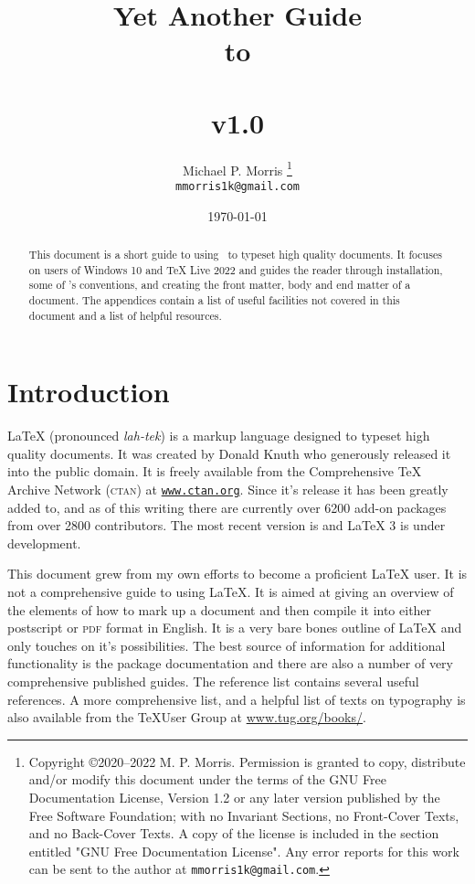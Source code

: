 \documentclass[12pt, a4paper]{article}
\title{
Yet Another Guide \\
to \\
\LaTeXe \\ 
{\Large v1.0} \\}
\author{Michael P. Morris \footnote {Copyright \copyright  2020--2022  M. P. Morris. Permission is granted to copy, distribute and/or modify this document under the terms of the GNU Free Documentation License, Version 1.2 or any later version published by the Free Software Foundation; with no Invariant Sections, no Front-Cover Texts, and no Back-Cover Texts. A copy of the license is included in the section entitled "GNU Free Documentation License". Any error reports for this work can be sent to the author at \texttt{mmorris1k@gmail.com}.} \\ 
\texttt{{\footnotesize mmorris1k@gmail.com}}}
\date{\today}
\begin{document}
\maketitle
\thispagestyle{empty}

\begin{abstract}
This document is a short guide to using \LaTeXe\ to typeset high quality documents. It focuses on users of Windows 10 and TeX Live 2022 and guides the reader through installation, some of \LaTeXe's conventions, and creating the front matter, body and end matter of a document. The appendices contain a list of useful facilities not covered in this document and a list of helpful resources.
\end{abstract}



{}
\tableofcontents

\clearpage
\listoffigures

\clearpage
\listoftables

\clearpage
{}

\section{Introduction}

LaTeX (pronounced \emph{lah-tek}) is a markup language designed to typeset high quality documents. It was created by Donald Knuth who generously released it into the public domain. It is freely available from the Comprehensive TeX Archive Network (\textsc{ctan}) at \texttt{\url{www.ctan.org}}. Since it’s release it has been greatly added to, and as of this writing there are currently over 6200 add-on packages from over 2800 contributors. The most recent version is \LaTeXe and LaTeX 3 is under development. 

This document grew from my own efforts to become a proficient LaTeX user. It is not a comprehensive guide to using LaTeX. It is aimed at giving an overview of the elements of how to mark up a document and then compile it into either postscript or \textsc{pdf} format in English. It is a very bare bones outline of LaTeX and only touches on it's possibilities. The best source of information for additional functionality is the package documentation and there are also a number of very comprehensive published guides. The reference list contains several useful references. A more comprehensive list, and a helpful list of texts on typography is also available from the \TeX User Group at \url{www.tug.org/books/}. 
\end{document}
